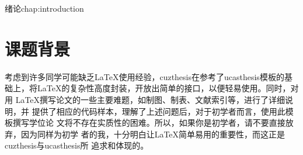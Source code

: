 \begin{cuzchapter}{绪论}{chap:introduction}

	\section{课题背景}\label{sec:background}

	考虑到许多同学可能缺乏\LaTeX{}使用经验，cuzthesis在参考了ucasthesis模板的基
	础上，将\LaTeX{}的复杂性高度封装，开放出简单的接口，以便轻易使用。同时，对用
	\LaTeX{}撰写论文的一些主要难题，如制图、制表、文献索引等，进行了详细说明，并
	提供了相应的代码样本，理解了上述问题后，对于初学者而言，使用此模板撰写学位论
	文将不存在实质性的困难。所以，如果你是初学者，请不要直接放弃，因为同样为初学
	者的我，十分明白让\LaTeX{}简单易用的重要性，而这正是cuzthesis与ucasthesis所
	追求和体现的。


\end{cuzchapter}
